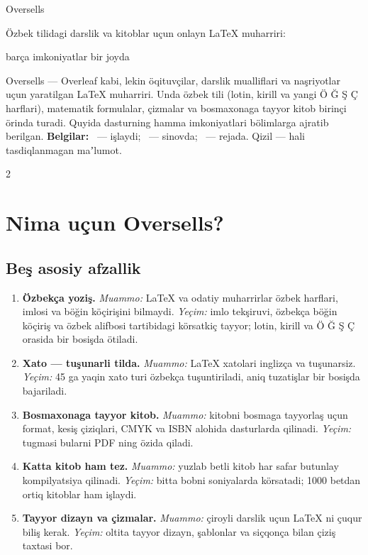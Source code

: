 \documentclass[11pt]{article}
\newcommand\tugma[1]{\tcbox[on line,boxsep=0pt,left=3pt,right=3pt,top=1.5pt,bottom=1.5pt,colback=fon,colframe=asosiy!50,boxrule=0.5pt,arc=2pt]{\small\textbf{#1}}}
\newcommand\holatbelgi[2]{\tcbox[on line,boxsep=0pt,left=2.5pt,right=2.5pt,top=1pt,bottom=1pt,colback=#1!12,colframe=#1,boxrule=0.4pt,arc=2pt]{\scriptsize\textbf{\color{#1!75!black}#2}}}
\newcommand\tayyor{\holatbelgi{yashil}{tayyor}}
\renewcommand\beta{\holatbelgi{urgu}{beta}}
\newcommand\reja{\holatbelgi{kulrang}{reja}}
\newcommand\tekshir[1]{\leavevmode{\color{qizil}\small[TEKSHIRILSIN: #1]}}
\begin{document}
\begin{tcolorbox}[colback=asosiy,colframe=asosiy,arc=3mm,left=6mm,right=6mm,top=4mm,bottom=4mm]
\color{white}
{\titlefont\fontsize{30}{34}\selectfont Oversells}\par\medskip
{\large Özbek tilidagi darslik va kitoblar uçun onlayn LaTeX muharriri:\par
barça imkoniyatlar bir joyda}
\end{tcolorbox}

Oversells --- Overleaf kabi, lekin öqituvçilar, darslik mualliflari va naşriyotlar uçun yaratilgan LaTeX muharriri. Unda özbek tili (lotin, kirill va yangi Ö Ğ Ş Ç harflari), matematik formulalar, çizmalar va bosmaxonaga tayyor kitob birinçi örinda turadi. Quyida dasturning hamma imkoniyatlari bölimlarga ajratib berilgan.
\textbf{Belgilar:} \tayyor\ --- işlaydi; \beta\ --- sinovda; \reja\ --- rejada. Qizil \tekshir{...} --- hali tasdiqlanmagan maʼlumot.

\begin{multicols}{2}\small
\tableofcontents
\end{multicols}

\section{Nima uçun Oversells?}

\subsection{Beş asosiy afzallik}
\begin{enumerate}
\item \textbf{Özbekça yoziş.} \emph{Muammo:} LaTeX va odatiy muharrirlar özbek harflari, imlosi va böğin köçirişini bilmaydi. \emph{Yeçim:} imlo tekşiruvi, özbekça böğin köçiriş va özbek alifbosi tartibidagi körsatkiç tayyor; lotin, kirill va Ö Ğ Ş Ç orasida bir bosişda ötiladi.
\item \textbf{Xato --- tuşunarli tilda.} \emph{Muammo:} LaTeX xatolari inglizça va tuşunarsiz. \emph{Yeçim:} 45 ga yaqin xato turi özbekça tuşuntiriladi, aniq tuzatişlar bir bosişda bajariladi.
\item \textbf{Bosmaxonaga tayyor kitob.} \emph{Muammo:} kitobni bosmaga tayyorlaş uçun format, kesiş çiziqlari, CMYK va ISBN alohida dasturlarda qilinadi. \emph{Yeçim:} \tugma{Bosmaxona} tugmasi bularni PDF ning özida qiladi.
\item \textbf{Katta kitob ham tez.} \emph{Muammo:} yuzlab betli kitob har safar butunlay kompilyatsiya qilinadi. \emph{Yeçim:} \tugma{Faqat şu bob} bitta bobni soniyalarda körsatadi; 1000 betdan ortiq kitoblar ham işlaydi.
\item \textbf{Tayyor dizayn va çizmalar.} \emph{Muammo:} çiroyli darslik uçun LaTeX ni çuqur biliş kerak. \emph{Yeçim:} oltita tayyor dizayn, şablonlar va siçqonça bilan çiziş taxtasi bor.
\end{enumerate}
\end{document}
